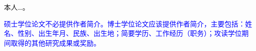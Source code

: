 
\begin{resume}

本人…。

\textcolor{blue}{
  硕士学位论文不必提供作者简介。博士学位论文应该提供作者简介，主要包括：姓名、性别、出生年月、民族、出生地；简要学历、工作经历（职务）；攻读学位期间取得的其他研究成果或奖励。
}

\end{resume}
